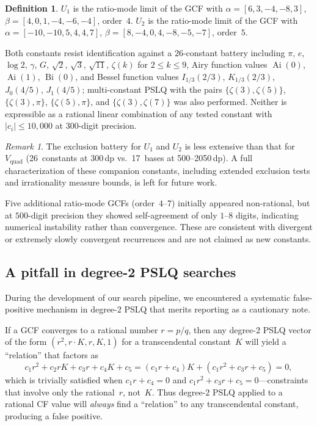 \documentclass[11pt,a4paper]{article}
\theoremstyle{definition}
\newtheorem{definition}[theorem]{Definition}
\theoremstyle{remark}
\newtheorem{remark}[theorem]{Remark}
\DeclareMathOperator{\Ai}{Ai}
\DeclareMathOperator{\Bi}{Bi}
\newcommand{\Vq}{V_{\mathrm{quad}}}
\begin{document}
\begin{definition}
$U_1$ is the ratio-mode limit of the GCF with
$\alpha = [6, 3, -4, -8, 3]$, $\beta = [4, 0, 1, -4, -6, -4]$, order~$4$.
$U_2$ is the ratio-mode limit of the GCF with
$\alpha = [-10, -10, 5, 4, 4, 7]$, $\beta = [8, -4, 0, 4, -8, -5, -7]$, order~$5$.
\end{definition}

Both constants resist identification against a $26$-constant
battery including $\pi$, $e$, $\log 2$, $\gamma$, $G$,
$\sqrt{2}$, $\sqrt{3}$, $\sqrt{11}$, $\zeta(k)$ for
$2 \leq k \leq 9$, Airy function values $\Ai(0)$, $\Ai(1)$,
$\Bi(0)$, and Bessel function values $I_{1/3}(2/3)$,
$K_{1/3}(2/3)$, $J_0(4/5)$, $J_1(4/5)$; multi-constant PSLQ
with the pairs $\{\zeta(3), \zeta(5)\}$,
$\{\zeta(3), \pi\}$, $\{\zeta(5), \pi\}$, and
$\{\zeta(3), \zeta(7)\}$ was also performed.
Neither is expressible as a rational linear combination of any
tested constant with $|c_i| \le 10{,}000$ at $300$-digit
precision.

\begin{remark}
The exclusion battery for $U_1$ and $U_2$ is less extensive than
that for $\Vq$ (26~constants at 300\,dp vs.\ 17~bases at
500--2050\,dp).  A full characterization of these companion
constants, including extended exclusion tests and irrationality
measure bounds, is left for future work.
\end{remark}

Five additional ratio-mode GCFs (order~$4$--$7$) initially appeared
non-rational, but at $500$-digit precision they showed self-agreement
of only $1$--$8$ digits, indicating numerical instability rather
than convergence. These are consistent with divergent or
extremely slowly convergent recurrences and are not claimed as new
constants.


\subsection{A pitfall in degree-2 PSLQ searches}\label{sec:pitfall}

During the development of our search pipeline, we encountered a
systematic false-positive mechanism in degree-$2$ PSLQ that merits
reporting as a cautionary note.

If a GCF converges to a rational number $r = p/q$, then any degree-$2$
PSLQ vector of the form $(r^2, r \cdot K, r, K, 1)$ for a
transcendental constant~$K$ will yield a ``relation'' that factors as
\[
  c_1 r^2 + c_2 r K + c_3 r + c_4 K + c_5
  = (c_1 r + c_4) K + (c_1 r^2 + c_3 r + c_5) = 0,
\]
which is trivially satisfied when $c_1 r + c_4 = 0$ and
$c_1 r^2 + c_3 r + c_5 = 0$---constraints that involve only the
rational~$r$, not~$K$. Thus degree-$2$ PSLQ applied to a rational
CF value will \emph{always} find a ``relation'' to any transcendental
constant, producing a false positive.
\end{document}
